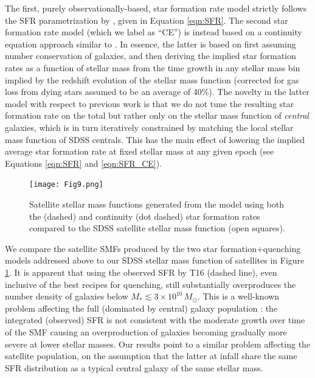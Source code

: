 The first, purely observationally-based, star formation rate model strictly follows the SFR parametrization by \citet[][T16 hereafter]{Tomczak2016THE4}, given in Equation \ref{eqn:SFR}. The second star formation rate model (which we label as ``CE'') is instead based on a continuity equation approach similar to \cite{Leja2015ReconcilingFunction}. In essence, the latter is based on first assuming number conservation of galaxies, and then deriving the implied star formation rates as a function of stellar mass from the time growth in any stellar mass bin implied by the redshift evolution of the stellar mass function (corrected for gas loss from dying stars assumed to be an average of 40\%). The novelty in the latter model with respect to previous work is that we do not tune the resulting star formation rate on the total but rather only on the stellar mass function of \textit{central} galaxies, which is in turn iteratively constrained by matching the local stellar mass function of SDSS centrals. This has the main effect of lowering the implied average star formation rate at fixed stellar mass at any given epoch (see Equations \ref{eqn:SFR} and \ref{eqn:SFR_CE}).

\begin{figure}
	\centering
	\texttt{[image: Fig9.png]}
	\caption{Satellite stellar mass functions generated from the model using both the \citet{Tomczak2016THE4} (dashed) and continuity (dot dashed) star formation rates compared to the SDSS satellite stellar mass function (open squares).}
	\label{fig:SMF_SF_Q}
\end{figure}

We compare the satellite SMFs produced by the two star formation+quenching models addressed above to our SDSS stellar mass function of satellites in Figure \ref{fig:SMF_SF_Q}. It is apparent that using the observed SFR by T16 (dashed line), even inclusive of the best recipes for quenching, still substantially overproduces the number density of galaxies below $M_* \lesssim 3\times 10^{10}\, M_{\odot}$. This is a well-known problem affecting the full (dominated by central) galaxy population \citep[e.g.,][]{Leja2015ReconcilingFunction}: the integrated (observed) SFR is not consistent with the moderate growth over time of the SMF causing an overproduction of galaxies becoming gradually more severe at lower stellar masses. Our results point to a similar problem affecting the satellite population, on the assumption that the latter at infall share the same SFR distribution as a typical central galaxy of the same stellar mass.





